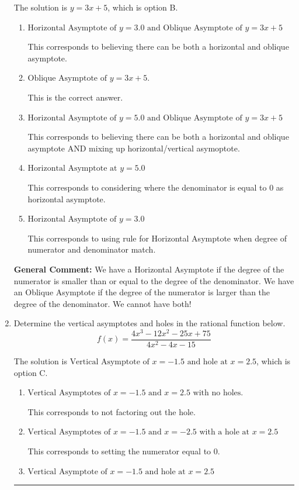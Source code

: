 \documentclass{extbook}[14pt]
\newcommand{\litem}[1]{\item #1

\rule{\textwidth}{0.4pt}}
\begin{document}
\begin{enumerate}
{The solution is \( y = 3x + 5 \), which is option B.\begin{enumerate}[label=\Alph*.]
\item \( \text{Horizontal Asymptote of } y = 3.0 \text{ and Oblique Asymptote of } y = 3x + 5 \)

This corresponds to believing there can be both a horizontal and oblique asymptote.
\item \( \text{Oblique Asymptote of } y = 3x + 5. \)

This is the correct answer.
\item \( \text{Horizontal Asymptote of } y = 5.0 \text{ and Oblique Asymptote of } y = 3x + 5 \)

This corresponds to believing there can be both a horizontal and oblique asymptote AND mixing up horizontal/vertical asymoptote.
\item \( \text{Horizontal Asymptote at } y = 5.0 \)

This corresponds to considering where the denominator is equal to 0 as horizontal asymptote.
\item \( \text{Horizontal Asymptote of } y = 3.0  \)

This corresponds to using rule for Horizontal Asymptote when degree of numerator and denominator match.
\end{enumerate}

\textbf{General Comment:} We have a Horizontal Asymptote if the degree of the numerator is smaller than or equal to the degree of the denominator. We have an Oblique Asymptote if the degree of the numerator is larger than the degree of the denominator. We cannot have both!
}
\litem{
Determine the vertical asymptotes and holes in the rational function below.
\[ f(x) = \frac{4x^{3} -12 x^{2} -25 x + 75}{4x^{2} -4 x -15} \]

The solution is \( \text{Vertical Asymptote of } x = -1.5 \text{ and hole at } x = 2.5 \), which is option C.\begin{enumerate}[label=\Alph*.]
\item \( \text{Vertical Asymptotes of } x = -1.5 \text{ and } x = 2.5 \text{ with no holes.} \)

This corresponds to not factoring out the hole.
\item \( \text{Vertical Asymptotes of } x = -1.5 \text{ and } x = -2.5 \text{ with a hole at } x = 2.5 \)

This corresponds to setting the numerator equal to 0.
\item \( \text{Vertical Asymptote of } x = -1.5 \text{ and hole at } x = 2.5 \)


\end{enumerate}}
\end{enumerate}
\end{document}
